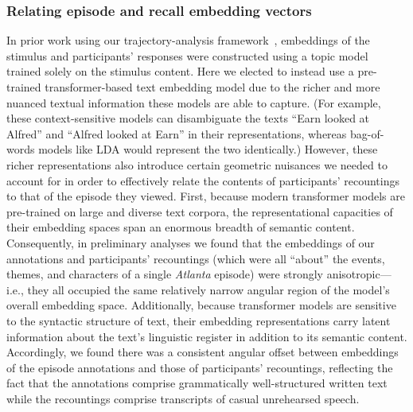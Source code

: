 \documentclass[10pt]{article}
\begin{document}
\subsubsection*{Relating episode and recall embedding vectors}

In prior work using our trajectory-analysis framework~\citep[e.g.,][]{HeusEtal21,Mann21a,MannEtal22,RaccEtal24,FitzEtal26}, embeddings of the stimulus and participants' responses were constructed using a topic model~\citep[Latent Dirichlet Allocation;][]{BleiEtal03} trained solely on the stimulus content.
Here we elected to instead use a pre-trained transformer-based text embedding model due to the richer and more nuanced textual information these models are able to capture. (For example, these context-sensitive models can disambiguate the texts ``Earn looked at Alfred'' and ``Alfred looked at Earn'' in their representations, whereas bag-of-words models like LDA would represent the two identically.)
However, these richer representations also introduce certain geometric nuisances we needed to account for in order to effectively relate the contents of participants' recountings to that of the episode they viewed.
First, because modern transformer models are pre-trained on large and diverse text corpora, the representational capacities of their embedding spaces span an enormous breadth of semantic content.
Consequently, in preliminary analyses we found that the embeddings of our annotations and participants' recountings (which were all ``about'' the events, themes, and characters of a single \textit{Atlanta} episode) were strongly anisotropic---i.e., they all occupied the same relatively narrow angular region of the model's overall embedding space.
Additionally, because transformer models are sensitive to the syntactic structure of text, their embedding representations carry latent information about the text's linguistic register in addition to its semantic content.
Accordingly, we found there was a consistent angular offset between embeddings of the episode annotations and those of participants' recountings, reflecting the fact that the annotations comprise grammatically well-structured written text while the recountings comprise transcripts of casual unrehearsed speech.
\end{document}
